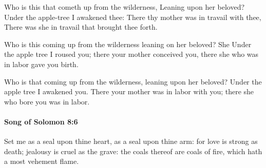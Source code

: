 			\begin{versebox}
					\item[BHS] 
					\item[LXX] 
					\item[ASV] Who is this that cometh up from the wilderness, Leaning upon her beloved? Under the apple-tree I awakened thee: There thy mother was in travail with thee, There was she in travail that brought thee forth.
					\item[NIV] Who is this coming up from the wilderness leaning on her beloved? She Under the apple tree I roused you; there your mother conceived you, there she who was in labor gave you birth.
					\item[NRSV] Who is that coming up from the wilderness, leaning upon her beloved? Under the apple tree I awakened you. There your mother was in labor with you; there she who bore you was in labor.
			\end{versebox}

		\paragraph{Song of Solomon 8:6} %
			\label{SONGOFSOLOMON-8-6}

			Set me as a seal upon thine heart, as a seal upon thine arm: for love is strong as death; jealousy is cruel as the grave: the coals thereof are coals of fire, which hath a most vehement flame.

